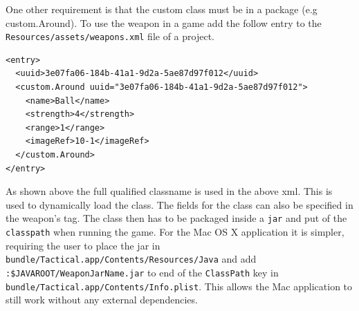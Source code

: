 One other requirement is that the custom class must be in a package (e.g custom.Around). To use the weapon in a game add the follow entry to the \texttt{Resources/assets/weapons.xml} file of a project.

\begin{lstlisting}[caption=Example of a custom weapon]
<entry>
  <uuid>3e07fa06-184b-41a1-9d2a-5ae87d97f012</uuid>
  <custom.Around uuid="3e07fa06-184b-41a1-9d2a-5ae87d97f012">
    <name>Ball</name>
    <strength>4</strength>
    <range>1</range>
    <imageRef>10-1</imageRef>
  </custom.Around>
</entry>
\end{lstlisting}

As shown above the full qualified classname is used in the above xml. This is used to dynamically load the class. The fields for the class can also be specified in the weapon's tag.  The class then has to be packaged inside a \texttt{jar} and put of the \texttt{classpath} when running the game. For the Mac OS X application it is simpler, requiring the user to place the jar in \lstinline{bundle/Tactical.app/Contents/Resources/Java} and add \texttt{:\$JAVAROOT/WeaponJarName.jar} to end of the \texttt{ClassPath} key in   \lstinline{bundle/Tactical.app/Contents/Info.plist}. This allows the Mac application to still work without any external dependencies.
